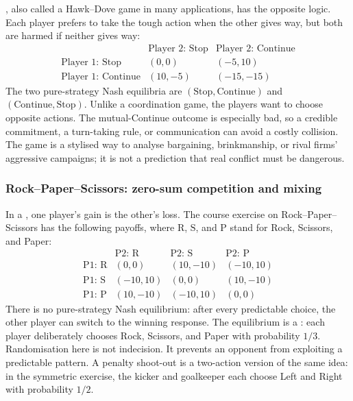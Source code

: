 , also called a Hawk--Dove game in many applications, has
the opposite logic. Each player prefers to take the tough action when the
other gives way, but both are harmed if neither gives way:
\[
\begin{array}{c|cc}
 & \text{Player 2: Stop} & \text{Player 2: Continue}\\
\hline
\text{Player 1: Stop} & (0,0) & (-5,10)\\
\text{Player 1: Continue} & (10,-5) & (-15,-15)
\end{array}
\]
The two pure-strategy Nash equilibria are
\((\text{Stop},\text{Continue})\) and
\((\text{Continue},\text{Stop})\). Unlike a coordination game, the players
want to choose opposite actions. The mutual-Continue outcome is especially
bad, so a credible commitment, a turn-taking rule, or communication can avoid
a costly collision. The game is a stylised way to analyse bargaining,
brinkmanship, or rival firms' aggressive campaigns; it is not a prediction
that real conflict must be dangerous.

\subsubsection{Rock--Paper--Scissors: zero-sum competition and mixing}

In a , one player's gain is the other's loss. The
course exercise on Rock--Paper--Scissors has the following payoffs, where
\(\mathrm{R}\), \(\mathrm{S}\), and \(\mathrm{P}\) stand for Rock, Scissors,
and Paper:
\[
\begin{array}{c|ccc}
 & \text{P2: }\mathrm{R} & \text{P2: }\mathrm{S}
 & \text{P2: }\mathrm{P}\\
\hline
\text{P1: }\mathrm{R} & (0,0) & (10,-10) & (-10,10)\\
\text{P1: }\mathrm{S} & (-10,10) & (0,0) & (10,-10)\\
\text{P1: }\mathrm{P} & (10,-10) & (-10,10) & (0,0)
\end{array}
\]
There is no pure-strategy Nash equilibrium: after every predictable choice,
the other player can switch to the winning response. The equilibrium is a
: each player deliberately chooses Rock, Scissors,
and Paper with probability \(1/3\). Randomisation here is not indecision. It
prevents an opponent from exploiting a predictable pattern. A penalty
shoot-out is a two-action version of the same idea: in the symmetric exercise,
the kicker and goalkeeper each choose Left and Right with probability \(1/2\).

